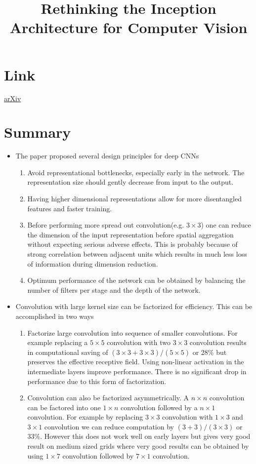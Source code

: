 \documentclass{article}
\title{Rethinking the Inception Architecture for Computer Vision}
\author{}
\date{}
\begin{document}
\maketitle

\section*{Link}
\href{https://arxiv.org/abs/1512.00567}{arXiv} 

\section*{Summary}
\begin{itemize}
    \item The paper proposed several design principles for deep CNNs
    \begin{enumerate}
        \item Avoid representational bottlenecks, especially early in the network. The representation size should gently decrease from input to the output.
        \item Having higher dimensional representations allow for more disentangled features and faster training.
        \item Before performing more spread out convolution(e.g. $3 \times 3$) one can reduce the dimension of the input representation before spatial aggregation without expecting serious adverse effects. This is probably because of strong correlation between adjacent units which results in much less loss of information during dimension reduction.
        \item Optimum performance of the network can be obtained by balancing the number of filters per stage and the depth of the network.
    \end{enumerate}
    \item Convolution with large kernel size can be factorized for efficiency. This can be accomplished in two ways
    \begin{enumerate}
        \item Factorize large convolution into sequence of smaller convolutions. For example replacing a $5\times5$ convolution with two $3\times 3$ convolution results in computational saving of $(3\times 3+3 \times 3)/(5\times 5)$ or 28\% but preserves the effective receptive field. Using non-linear activation in the intermediate layers improve performance. There is no significant drop in performance due to this form of factorization. 
        \item Convolution can also be factorized asymmetrically. A $n\times n$ convolution can be factored into one $1\times n$ convolution followed by a $n \times 1$ convolution. For example by replacing $3\times 3$ convolution with $1 \times 3$ and $3 \times 1$ convolution we can reduce computation by $(3+3)/(3\times 3)$ or 33\%. However this does not work well on early layers but gives very good result on medium sized grids where very good results can be obtained by using $1\times 7$ convolution followed by $7 \times 1$ convolution.  

\end{enumerate}
\end{itemize}
\end{document}
